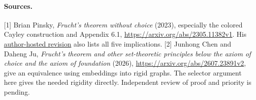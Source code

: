 \documentclass[11pt]{article}
\begin{document}
\paragraph{Sources.} [1] Brian Pinsky, \emph{Frucht's theorem without choice} (2023), especially the colored Cayley construction and Appendix 6.1, \url{https://arxiv.org/abs/2305.11382v1}. His \href{https://sites.math.rutgers.edu/~bp466/frucht.pdf}{author-hosted revision} also lists all five implications.
[2] Junhong Chen and Daheng Ju, \emph{Frucht's theorem and other set-theoretic principles below the axiom of choice and the axiom of foundation} (2026), \url{https://arxiv.org/abs/2607.23891v2}, give an equivalence using embeddings into rigid graphs. The selector argument here gives the needed rigidity directly. Independent review of proof and priority is pending.
\end{document}
